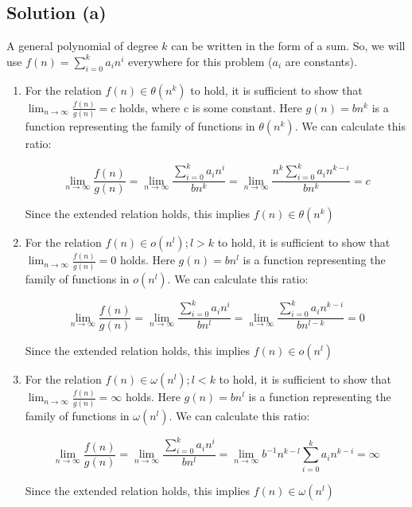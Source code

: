 \documentclass[a4paper,12pt]{article} %
\begin{document}
\subsection*{Solution (a)}
A general polynomial of degree $k$ can be written in the form of a sum. So, we will use $f(n) = \sum_{i = 0}^{k} a_in^i$ everywhere for this problem ($a_i$ are constants).
\begin{enumerate}
    \item For the relation $f(n) \in \theta(n^k)$ to hold, it is sufficient to show that $\lim_{n \to \infty}\frac{f(n)}{g(n)} = c$ holds, where c is some constant. Here $g(n) = bn^k$ is a function representing the family of functions in $\theta(n^k)$. We can calculate this ratio:
    
    $$ \lim_{n \to \infty} \frac{f(n)}{g(n)} = \lim_{n \to \infty} \frac{\sum_{i = 0}^{k} a_in^i}{bn^k} = \lim_{n \to \infty} \frac{n^k\sum_{i = 0}^{k} a_in^{k-i}}{bn^k} = c$$
    
    Since the extended relation holds, this implies $f(n) \in \theta(n^k)$

    \item For the relation $f(n) \in o(n^l); l>k$ to hold, it is sufficient to show that $\lim_{n \to \infty}\frac{f(n)}{g(n)} = 0$ holds. Here $g(n) = bn^l$ is a function representing the family of functions in $o(n^l)$. We can calculate this ratio:
    
    $$ \lim_{n \to \infty} \frac{f(n)}{g(n)} = \lim_{n \to \infty} \frac{\sum_{i = 0}^{k} a_in^i}{bn^l} = \lim_{n \to \infty} \frac{\sum_{i = 0}^{k} a_in^{k-i}}{bn^{l-k}} = 0$$
    
    Since the extended relation holds, this implies $f(n) \in o(n^l)$
    
    \item For the relation $f(n) \in \omega(n^l); l<k$ to hold, it is sufficient to show that $\lim_{n \to \infty}\frac{f(n)}{g(n)} = \infty$ holds. Here $g(n) = bn^l$ is a function representing the family of functions in $\omega(n^l)$. We can calculate this ratio:
    
    $$ \lim_{n \to \infty} \frac{f(n)}{g(n)} = \lim_{n \to \infty} \frac{\sum_{i = 0}^{k} a_in^i}{bn^l} = \lim_{n \to \infty} b^{-1}n^{k-l}\sum_{i = 0}^{k} a_in^{k-i} = \infty$$
    
    Since the extended relation holds, this implies $f(n) \in \omega(n^l)$

\end{enumerate}
\end{document}
